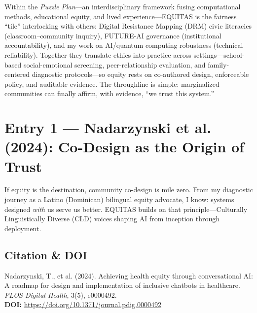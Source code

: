 \documentclass[11pt,twoside]{article}
\begin{document}
\vspace{0.2cm}

\noindent Within the \textit{Puzzle Plan}---an interdisciplinary framework fusing computational methods, educational equity, and lived experience---\textsc{EQUITAS} is the fairness ``tile'' interlocking with others: Digital Resistance Mapping (DRM) civic literacies (classroom--community inquiry), FUTURE-AI governance (institutional accountability), and my work on AI/quantum computing robustness (technical reliability). Together they translate ethics into practice across settings---school-based social-emotional screening, peer-relationship evaluation, and family-centered diagnostic protocols---so equity rests on co-authored design, enforceable policy, and auditable evidence. The throughline is simple: marginalized communities can finally affirm, with evidence, ``we trust this system.''

\newpage

\label{entry1}
\section*{Entry 1 --- Nadarzynski et al. (2024): Co-Design as the Origin of Trust}

\vspace{-0.3cm}

If equity is the destination, community co-design is mile zero. From my diagnostic journey as a Latino (Dominican) bilingual equity advocate, I know: systems designed \emph{with} us serve us better. EQUITAS builds on that principle---Culturally Linguistically Diverse (CLD) voices shaping AI from inception through deployment.

\vspace{-0.3cm}

\subsection*{Citation \& DOI}

\vspace{-0.3cm}

Nadarzynski, T., et al. (2024). Achieving health equity through conversational AI: A roadmap for design and implementation of inclusive chatbots in healthcare. \textit{PLOS Digital Health}, 3(5), e0000492. \\

\textbf{DOI:} \href{https://doi.org/10.1371/journal.pdig.0000492}{https://doi.org/10.1371/journal.pdig.0000492}
\end{document}
